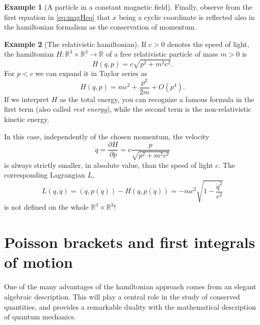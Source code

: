\documentclass[english,fontsize=11pt,paper=b5]{scrbook}
\theoremstyle{definition}
\newtheorem{example}{Example}[chapter]
\begin{document}
\begin{example}[A particle in a constant magnetic field]
      Finally, observe from the first equation in \eqref{eq:magHeq} that $x$ being a cyclic coordinate is reflected also in the hamiltonian formalism as the conservation of momentum.
    \end{example}

    \begin{example}[The relativistic hamiltonian]
      If $c>0$ denotes the speed of light, the hamiltonian $H:\mathbb{R}^3\times\mathbb{R}^3\to\mathbb{R}$ of a free relativistic particle of mass $m>0$ is
      \begin{equation}
        H(q,p) = c \sqrt{p^2 + m^2 c^2}.
      \end{equation}
      For $p < c$ we can expand it in Taylor series as
      \begin{equation}
        H(q,p) = mc^2 + \frac{p^2}{2m} + O(p^4).
      \end{equation}
      If we interpret $H$ as the total energy, you can recognize a famous formula in the first term (also called \emph{rest energy}), while the second term is the non-relativistic kinetic energy.

      In this case, independently of the chosen momentum, the velocity
      \begin{equation}
        \dot q = \frac{\partial H}{\partial p} = c \frac{p}{\sqrt{p^2 + m^2 c^2}}
      \end{equation}
      is always strictly smaller, in absolute value, than the speed of light $c$.
      The corresponding Lagrangian $L$,
      \begin{equation}
        L(q,\dot q) = (\dot q, p(\dot q)) - H(q, p(\dot q)) = -mc^2 \sqrt{1-\frac{\dot q^2}{c^2}}
      \end{equation}
      is not defined on the whole $\mathbb{R}^3\times\mathbb{R}^3$!
    \end{example}

    \section{Poisson brackets and first integrals of motion}\label{sec:poisson}

    One of the many advantages of the hamiltonian approach comes from an elegant algebraic description.
    This will play a central role in the study of conserved quantities, and provides a remarkable duality with the mathematical description of quantum mechanics.
\end{document}
